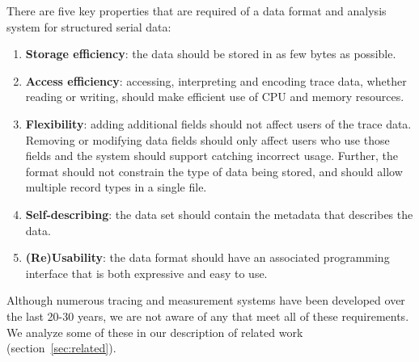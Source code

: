 There are five key properties that are required of a data format
and analysis system for structured serial data:
\begin{enumerate}
\item \textbf{Storage efficiency}: the data
should be stored in as few bytes as possible.
\item \textbf{Access efficiency}:
accessing, interpreting and encoding trace data, whether
reading or writing,
should make efficient use of CPU and memory resources.
\item \textbf{Flexibility}:
adding additional fields should not affect users of the trace data.
Removing or modifying data fields should only affect users who use those
fields and the system should support catching incorrect usage.
Further, the format should not constrain the
type of data being stored, and should allow multiple
record types in a single file.
\item \textbf{Self-describing}:  the data set should contain the
metadata that describes the data.
\item \textbf{(Re)Usability}: the data format should have an associated
programming interface that is both expressive and easy to use.
\end{enumerate}
Although numerous tracing and measurement systems have been developed 
over the last 20-30
years, 
we are not aware of any that meet all of these
requirements. We analyze some of these in our description of related 
work (section~\ref{sec:related}).

